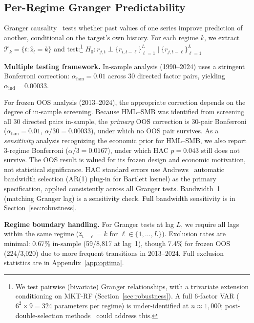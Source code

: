 \documentclass[sigconf,anonymous]{acmart}
\begin{document}
\subsection{Per-Regime Granger Predictability}
\label{sec:granger_method}

Granger causality~\cite{granger1969investigating,shojaie2022granger} tests whether past values
of one series improve prediction of another, conditional on the target's own history.
For each regime $k$, we extract $\mathcal{T}_k = \{t : \hat{z}_t = k\}$
and test:\footnote{We test pairwise (bivariate) Granger relationships, with a
trivariate extension conditioning on MKT-RF (Section~\ref{sec:robustness}).
A full 6-factor VAR ($6^2 \times 9 = 324$ parameters per regime) is
under-identified at $n \approx 1{,}000$; post-double-selection
methods~\cite{hecq2023granger} could address this.}
$H_0: r_{j,t} \perp \{r_{i,t-\ell}\}_{\ell=1}^{L} \mid \{r_{j,t-\ell}\}_{\ell=1}^{L}$

\textbf{Multiple testing framework.}
In-sample analysis (1990--2024) uses a stringent Bonferroni correction:
$\alpha_{\text{fam}} = 0.01$ across 30 directed factor pairs, yielding
$\alpha_{\text{ind}} = 0.00033$. 

For frozen OOS analysis (2013--2024), the appropriate correction depends on the
degree of in-sample screening. Because HML--SMB was identified from screening
all 30 directed pairs in-sample, the \emph{primary} OOS correction is
30-pair Bonferroni ($\alpha_{\text{fam}} = 0.01$, $\alpha/30 = 0.00033$), under
which no OOS pair survives. As a \emph{sensitivity} analysis recognizing
the economic prior for HML--SMB, we also report 3-regime Bonferroni
($\alpha/3 = 0.0167$), under which HAC $p = 0.043$ still does not survive.
The OOS result is valued for its frozen
design and economic motivation, not statistical significance.
HAC standard errors use Andrews~\cite{andrews1991heteroskedasticity}
automatic bandwidth selection (AR(1) plug-in for Bartlett kernel) as the primary specification,
applied consistently across all Granger tests. Bandwidth~1 (matching Granger lag) is a sensitivity check. Full bandwidth sensitivity is in
Section~\ref{sec:robustness}.

\textbf{Regime boundary handling.} For Granger tests at lag $L$,
we require all lags within the same regime ($\hat{z}_{t-\ell} = k$ for
$\ell \in \{1, \ldots, L\}$). Exclusion rates are minimal: 0.67\%
in-sample (59/8{,}817 at lag~1), though 7.4\% for frozen OOS (224/3{,}020)
due to more frequent transitions in 2013--2024. Full exclusion statistics
are in Appendix~\ref{app:optima}.
\end{document}
